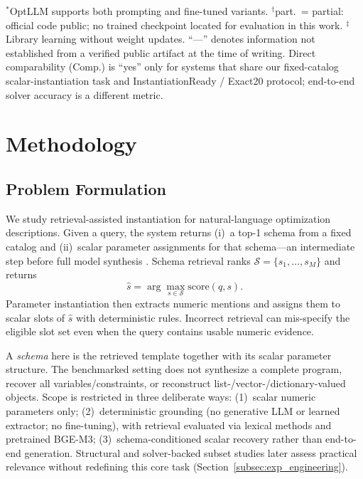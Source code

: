 \documentclass[pdflatex,sn-basic,Numbered]{sn-jnl}
\begin{document}
\begin{table}[t]
\vspace{1mm}
\raggedright
\footnotesize
$^{*}$OptLLM supports both prompting and fine-tuned variants.
$^{\dagger}$part.\ = partial: official code public; no trained checkpoint located for evaluation in this work.
$^{\ddagger}$Library learning without weight updates.
``---'' denotes information not established from a verified public artifact at the time of writing.
Direct comparability (Comp.) is ``yes'' only for systems that share our fixed-catalog scalar-instantiation
task and InstantiationReady / Exact20 protocol; end-to-end solver accuracy is a different metric.
\end{table}

\section{Methodology}
\label{sec:method}

\subsection{Problem Formulation}
\label{subsec:method_problem}

We study retrieval-assisted instantiation for natural-language optimization descriptions. Given a query, the system returns (i)~a top-1 schema from a fixed catalog and (ii)~scalar parameter assignments for that schema---an intermediate step before full model synthesis \cite{nlp4lp_dataset,ramamonjison2023nl4opt,ahmaditeshnizi2024optimus_icml}. Schema retrieval ranks $\mathcal{S}=\{s_1,\dots,s_M\}$ and returns
\begin{equation}
\hat{s}=\arg\max_{s \in \mathcal{S}} \mathrm{score}(q,s).
\label{eq:top1_schema}
\end{equation}
Parameter instantiation then extracts numeric mentions and assigns them to scalar slots of $\hat{s}$ with deterministic rules. Incorrect retrieval can mis-specify the eligible slot set even when the query contains usable numeric evidence.

A \emph{schema} here is the retrieved template together with its scalar parameter structure. The benchmarked setting does not synthesize a complete program, recover all variables/constraints, or reconstruct list-/vector-/dictionary-valued objects. Scope is restricted in three deliberate ways: (1)~scalar numeric parameters only; (2)~deterministic grounding (no generative LLM or learned extractor; no fine-tuning), with retrieval evaluated via lexical methods and pretrained BGE-M3; (3)~schema-conditioned scalar recovery rather than end-to-end generation. Structural and solver-backed subset studies later assess practical relevance without redefining this core task (Section~\ref{subsec:exp_engineering}).
\end{document}
